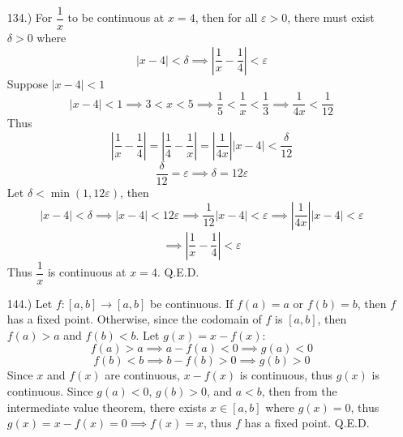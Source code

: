 \documentclass[12pt]{article}
\newcommand{\vertb}[1]{\left\vert#1\right\vert}
\newcommand{\e}{\varepsilon}
\begin{document}
\begin{itemize}
    \item [134.)] For $\dfrac{1}{x}$ to be continuous at $x=4$, then for all $\e>0$, there must exist $\delta>0$ where
    \[\vertb{x-4}<\delta\implies\vertb{\frac{1}{x}-\frac{1}{4}}<\e\]
    Suppose $\vertb{x-4}<1$
    \[\vertb{x-4}<1\implies3<x<5\implies\frac{1}{5}<\frac{1}{x}<\frac{1}{3}\implies\frac{1}{4x}<\frac{1}{12}\]
    Thus
    \[\vertb{\frac{1}{x}-\frac{1}{4}}=\vertb{\frac{1}{4}-\frac{1}{x}}=\vertb{\frac{1}{4x}}\vertb{x-4}<\frac{\delta}{12}\]
    \[\frac{\delta}{12}=\e\implies\delta=12\e\]
    Let $\delta<\min(1,12\e)$, then
    \[\vertb{x-4}<\delta\implies\vertb{x-4}<12\e\implies \frac{1}{12}\vertb{x-4}<\e\implies\vertb{\frac{1}{4x}}\vertb{x-4}<\e\]
    \[\implies \vertb{\frac{1}{x}-\frac{1}{4}}<\e\]
    Thus $\dfrac{1}{x}$ is continuous at $x=4$. Q.E.D.




 





    \item [144.)] Let $f:[a,b]\to[a,b]$ be continuous. If $f(a)=a$ or $f(b)=b$, then $f$ has a fixed point. Otherwise, since the codomain of $f$ is $[a,b]$, then $f(a)>a$ and $f(b)<b$. Let $g(x)=x-f(x)$:
    \[f(a)>a\implies a-f(a)<0\implies g(a)<0\]
    \[f(b)<b\implies b-f(b)>0\implies g(b)>0\]
    Since $x$ and $f(x)$ are continuous, $x-f(x)$ is continuous, thus $g(x)$ is continuous. Since $g(a)<0$, $g(b)>0$, and $a<b$, then from the intermediate value theorem, there exists $x\in[a,b]$ where $g(x)=0$, thus $g(x)=x-f(x)=0\implies f(x)=x$, thus $f$ has a fixed point. Q.E.D.


\end{itemize}
\end{document}

